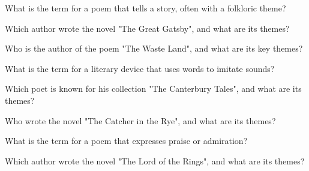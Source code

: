 \documentclass[12pt,a4paper]{book}
\begin{document}
\begin{enhancedmcq}[Question 26]{What is the term for a poem that tells a story, often with a folkloric theme?}
\end{enhancedmcq}

\begin{enhancedmcq}[Question 27]{Which author wrote the novel "The Great Gatsby", and what are its themes?}
\end{enhancedmcq}

\begin{enhancedmcq}[Question 28]{Who is the author of the poem "The Waste Land", and what are its key themes?}
\end{enhancedmcq}

\begin{enhancedmcq}[Question 29]{What is the term for a literary device that uses words to imitate sounds?}
\end{enhancedmcq}

\begin{enhancedmcq}[Question 30]{Which poet is known for his collection "The Canterbury Tales", and what are its themes?}
\end{enhancedmcq}

\begin{enhancedmcq}[Question 31]{Who wrote the novel "The Catcher in the Rye", and what are its themes?}
\end{enhancedmcq}

\begin{enhancedmcq}[Question 32]{What is the term for a poem that expresses praise or admiration?}
\end{enhancedmcq}

\begin{enhancedmcq}[Question 33]{Which author wrote the novel "The Lord of the Rings", and what are its themes?}
\end{enhancedmcq}
\end{document}
